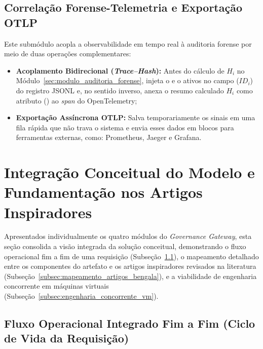 \subsection{Correlação Forense-Telemetria e Exportação OTLP}
\label{subsec:correlacao_exportacao_otlp}

Este submódulo acopla a observabilidade em tempo real à auditoria forense por meio de duas operações complementares:
\begin{itemize}
  \item \textbf{Acoplamento Bidirecional (\textit{Trace--Hash}):} Antes do cálculo de $H_i$ no Módulo~\ref{sec:modulo_auditoria_forense}, injeta o  e o  ativos no campo  ($ID_i$) do registro JSONL e, no sentido inverso, anexa o resumo calculado $H_i$ como atributo () ao \textit{span} do OpenTelemetry;
  \item \textbf{Exportação Assíncrona OTLP:} Salva temporariamente os sinais em uma fila rápida que não trava o sistema e envia esses dados em blocos para ferramentas externas, como: Prometheus, Jaeger e Grafana.
\end{itemize}

\section{Integração Conceitual do Modelo e Fundamentação nos Artigos Inspiradores}
\label{sec:integracao_bengala}

Apresentados individualmente os quatro módulos do \textit{Governance Gateway}, esta seção consolida a visão integrada da solução conceitual, demonstrando o fluxo operacional fim a fim de uma requisição (Subseção~\ref{subsec:fluxo_fim_a_fim}), o mapeamento detalhado entre os componentes do artefato e os artigos inspiradores revisados na literatura \cite{singh2026mcpsecure,zhang2025acfix,buhler2026agentbound,jang2026hierarchical,hou2025mcp,hasan2026mcp,guo2025measurement} (Subseção~\ref{subsec:mapeamento_artigos_bengala}), e a viabilidade de engenharia concorrente em máquinas virtuais (Subseção~\ref{subsec:engenharia_concorrente_vm}).

\subsection{Fluxo Operacional Integrado Fim a Fim (Ciclo de Vida da Requisição)}
\label{subsec:fluxo_fim_a_fim}

